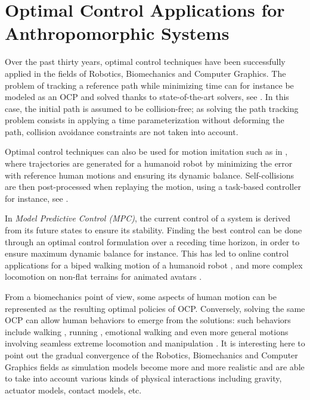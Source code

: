\section{Optimal Control Applications for Anthropomorphic Systems}

Over the past thirty years, optimal control techniques have been
successfully applied in the fields of Robotics, Biomechanics and
Computer Graphics. The problem of tracking a reference path while
minimizing time can for instance be modeled as an OCP and solved
thanks to state-of-the-art solvers, see
\cite{bobrow1985time,verscheure2009time,suleiman2010time}. In this
case, the initial path is assumed to be collision-free; as solving the
path tracking problem consists in applying a time parameterization
without deforming the path, collision avoidance constraints are not
taken into account.

Optimal control techniques can also be used for motion imitation such
as in \cite{suleiman2008human}, where trajectories are generated for a
humanoid robot by minimizing the error with reference human motions
and ensuring its dynamic balance. Self-collisions are then
post-processed when replaying the motion, using a task-based
controller for instance, see \cite{kanehiro2008local}.

In \emph{Model Predictive Control (MPC)}, the current control of a
system is derived from its future states to ensure its
stability. Finding the best control can be done through an optimal
control formulation over a receding time horizon, in order to ensure
maximum dynamic balance for instance. This has led to online control
applications for a biped walking motion of a humanoid robot
\cite{kaji03,herdt2010online}, and more complex locomotion on non-flat
terrains for animated avatars
\cite{coros2010generalized,tassa2012synthesis}.

From a biomechanics point of view, some aspects of human motion can be
represented as the resulting optimal policies of OCP. Conversely,
solving the same OCP can allow human behaviors to emerge from the
solutions: such behaviors include walking
\cite{chevallereau2001optimal}, running \cite{Schultz2010}, emotional
walking \cite{felis2012modeling} and even more general motions
involving seamless extreme locomotion and manipulation
\cite{mordatch2012discovery}. It is interesting here to point out the
gradual convergence of the Robotics, Biomechanics and Computer
Graphics fields as simulation models become more and more realistic
and are able to take into account various kinds of physical
interactions including gravity, actuator models, contact models, etc.

